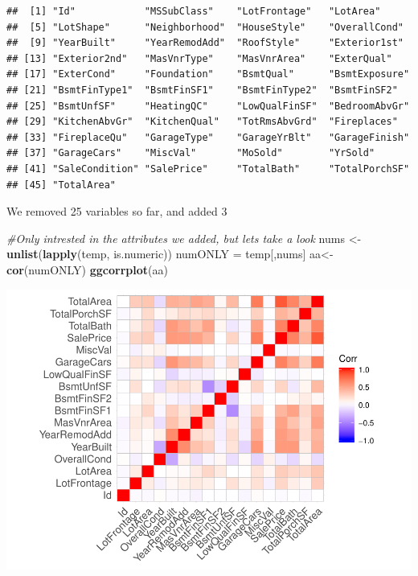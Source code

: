 \documentclass[]{article}
\newenvironment{Shaded}{\begin{snugshade}}{\end{snugshade}}
\newcommand{\KeywordTok}[1]{\textcolor[rgb]{0.13,0.29,0.53}{\textbf{#1}}}
\newcommand{\StringTok}[1]{\textcolor[rgb]{0.31,0.60,0.02}{#1}}
\newcommand{\CommentTok}[1]{\textcolor[rgb]{0.56,0.35,0.01}{\textit{#1}}}
\newcommand{\NormalTok}[1]{#1}
\begin{document}
\begin{verbatim}
##  [1] "Id"            "MSSubClass"    "LotFrontage"   "LotArea"      
##  [5] "LotShape"      "Neighborhood"  "HouseStyle"    "OverallCond"  
##  [9] "YearBuilt"     "YearRemodAdd"  "RoofStyle"     "Exterior1st"  
## [13] "Exterior2nd"   "MasVnrType"    "MasVnrArea"    "ExterQual"    
## [17] "ExterCond"     "Foundation"    "BsmtQual"      "BsmtExposure" 
## [21] "BsmtFinType1"  "BsmtFinSF1"    "BsmtFinType2"  "BsmtFinSF2"   
## [25] "BsmtUnfSF"     "HeatingQC"     "LowQualFinSF"  "BedroomAbvGr" 
## [29] "KitchenAbvGr"  "KitchenQual"   "TotRmsAbvGrd"  "Fireplaces"   
## [33] "FireplaceQu"   "GarageType"    "GarageYrBlt"   "GarageFinish" 
## [37] "GarageCars"    "MiscVal"       "MoSold"        "YrSold"       
## [41] "SaleCondition" "SalePrice"     "TotalBath"     "TotalPorchSF" 
## [45] "TotalArea"
\end{verbatim}

We removed 25 variables so far, and added 3

\begin{Shaded}
\begin{Highlighting}[]
\CommentTok{#Only intrested in the attributes we added, but lets take a look}
\NormalTok{nums <-}\StringTok{ }\KeywordTok{unlist}\NormalTok{(}\KeywordTok{lapply}\NormalTok{(temp, is.numeric))}
\NormalTok{numONLY =}\StringTok{ }\NormalTok{temp[,nums]}
\NormalTok{aa<-}\KeywordTok{cor}\NormalTok{(numONLY)}
\KeywordTok{ggcorrplot}\NormalTok{(aa)}
\end{Highlighting}
\end{Shaded}

\includegraphics{EDA_files/figure-latex/unnamed-chunk-109-1.pdf}
\end{document}
